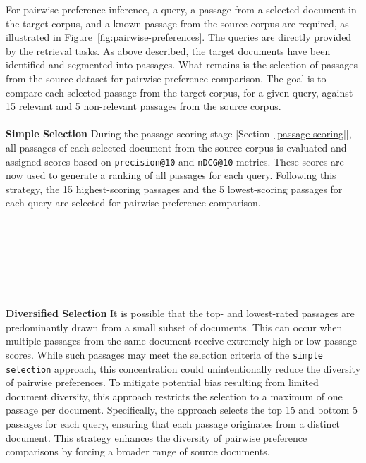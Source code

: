 For pairwise preference inference, a query, a passage from a selected document in the target corpus, and a known passage from the source corpus are required, as illustrated in Figure~\ref{fig:pairwise-preferences}. The queries are directly provided by the retrieval tasks. As above described, the target documents have been identified and segmented into passages. What remains is the selection of passages from the source dataset for pairwise preference comparison. The goal is to compare each selected passage from the target corpus, for a given query, against 15 relevant and 5 non-relevant passages from the source corpus.
\\\\
\textbf{Simple Selection} During the passage scoring stage [Section~\ref{passage-scoring}], all passages of each selected document from the source corpus is evaluated and assigned scores based on \texttt{precision@10} and \texttt{nDCG@10} metrics. These scores are now used to generate a ranking of all passages for each query. Following this strategy, the 15 highest-scoring passages and the 5 lowest-scoring passages for each query are selected for pairwise preference comparison.
\\\\\\\\\\\\\\\\
\textbf{Diversified Selection} It is possible that the top- and lowest-rated passages are predominantly drawn from a small subset of documents. This can occur when multiple passages from the same document receive extremely high or low passage scores. While such passages may meet the selection criteria of the \texttt{simple selection} approach, this concentration could unintentionally reduce the diversity of pairwise preferences. To mitigate potential bias resulting from limited document diversity, this approach restricts the selection to a maximum of one passage per document. Specifically, the approach selects the top 15 and bottom 5 passages for each query, ensuring that each passage originates from a distinct document. This strategy enhances the diversity of pairwise preference comparisons by forcing a broader range of source documents.
